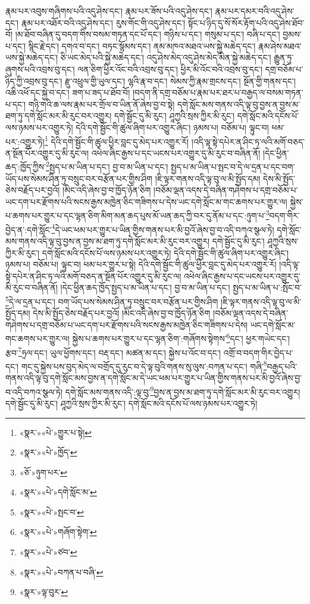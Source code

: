 རྣམ་པར་འབུས་གཞིགས་པའི་འདུ་ཤེས་དང་། རྣམ་པར་ཟོས་པའི་འདུ་ཤེས་དང་། རྣམ་པར་དམར་བའི་འདུ་ཤེས་དང་། རྣམ་པར་འཐོར་བའི་འདུ་ཤེས་དང་། རུས་གོང་གི་འདུ་ཤེས་དང་། སྟོང་པ་ཉིད་དུ་སོ་སོར་རྟོག་པའི་འདུ་ཤེས་ཐོབ་བོ། །མ་ཐོབ་བཞིན་དུ་བདག་གིས་བསམ་གཏན་དང་པོ་དང་། གཉིས་པ་དང་། གསུམ་པ་དང་། བཞི་པ་དང་། བྱམས་པ་དང་། སྙིང་རྗེ་དང་། དགའ་བ་དང་། བཏང་སྙོམས་དང་། ནམ་མཁའ་མཐའ་ཡས་སྐྱེ་མཆེད་དང་། རྣམ་ཤེས་མཐའ་ཡས་སྐྱེ་མཆེད་དང་། ཅི་ཡང་མེད་པའི་སྐྱེ་མཆེད་དང་། འདུ་ཤེས་མེད་འདུ་ཤེས་མེད་མིན་སྐྱེ་མཆེད་དང་། རྒྱུན་ཏུ་ཞུགས་པའི་འབྲས་བུ་དང་། ལན་ཅིག་ཕྱིར་འོང་བའི་འབྲས་བུ་དང་། ཕྱིར་མི་འོང་བའི་འབྲས་བུ་དང་། དགྲ་བཅོམ་པ་ཉིད་ཀྱི་འབྲས་བུ་དང་། རྫུ་འཕྲུལ་གྱི་ཡུལ་དང་། ལྷའི་རྣ་བ་དང་། སེམས་ཀྱི་རྣམ་གྲངས་དང་། སྔོན་གྱི་གནས་དང་། འཆི་འཕོ་དང་སྐྱེ་བ་དང་། ཟག་པ་ཟད་པ་ཐོབ་བོ། །བདག་ནི་དགྲ་བཅོམ་པ་རྣམ་པར་ཐར་པ་བརྒྱད་ལ་བསམ་གཏན་པ་དང་། གཉི་གའི་ཆ་ལས་རྣམ་པར་གྲོལ་བ་ཡིན་ནོ་ཞེས་བྱ་བ་སྟེ། དགེ་སློང་མས་གནས་འདི་ལྟ་བུ་བྱས་ན་བྱས་མ་ཐག་ཏུ་དགེ་སློང་མར་མི་རུང་བར་འགྱུར། དགེ་སྦྱོང་དུ་མི་རུང་། ཤཱཀྱའི་སྲས་ཀྱིར་མི་རུང་། དགེ་སློང་མའི་དངོས་པོ་ལས་ཉམས་པར་འགྱུར་ཏེ། དེའི་དགེ་སྦྱོང་གི་ཚུལ་ཞིག་པར་འགྱུར་ཞིང་། ཉམས་པ། བཅོམ་པ། ལྟུང་བ། ཕམ་པར་:འགྱུར་ཏེ།\footnote{«སྣར་»«པེ་»གྱུར་པ་སྟེ།} དེའི་དགེ་སྦྱོང་གི་ཚུལ་ཕྱིར་བླང་དུ་མེད་པར་འགྱུར་རོ། །འདི་ལྟ་སྟེ་དཔེར་ན་ཤིང་ཏ་ལའི་མགོ་བཅད་ན་སྔོན་པོར་འགྱུར་དུ་མི་རུང་ལ། འཕེལ་ཞིང་རྒྱས་པ་དང་ཡངས་པར་འགྱུར་དུ་མི་རུང་བ་བཞིན་ནོ། །དེང་ཕྱིན་ཆད་:ཁྱོད་ཀྱིས་\footnote{«སྣར་»«པེ་»ཁྱོད་}སྤྱད་པ་མ་ཡིན་པ་དང་། བྱ་བ་མ་ཡིན་པ་དང་། སྤྱད་པ་མ་ཡིན་པ་སྤང་བ་དེ་ལ་དྲན་པ་དང་བག་ཡོད་པས་སེམས་ཤིན་ཏུ་བསྲུང་བར་བརྩོན་པར་གྱིས་ཤིག །ཇི་ལྟར་གནས་འདི་ལྟ་བུ་ལ་མི་སྤྱོད་དམ། དེས་མི་སྤྱོད་ཅེས་བརྗོད་པར་བྱའོ། །མིང་འདི་ཞེས་བྱ་བ་ཁྱོད་ཉོན་ཅིག །བཅོམ་ལྡན་འདས་དེ་བཞིན་གཤེགས་པ་དགྲ་བཅོམ་པ་ཡང་དག་པར་རྫོགས་པའི་སངས་རྒྱས་མཁྱེན་ཅིང་གཟིགས་པ་དེས་ཡང་དགེ་སློང་མ་གང་ཆགས་པར་གྱུར་ལ། སྐྱེས་པ་ཆགས་པར་གྱུར་པ་དང་ལྷན་ཅིག་མིག་མན་ཆད་པུས་མོ་ཡན་ཆད་ཀྱི་བར་དུ་ནོམ་པ་དང་:ཉུག་པ་\footnote{«ཅོ་»ཉུག་པར་}བདག་གིར་བྱེད་ན་:དགེ་སློང་\footnote{«སྣར་»«པེ་»དགེ་སློང་མ་}དེ་ཡང་ཕམ་པར་གྱུར་པ་ཡིན་གྱིས་གནས་པར་མི་བྱའོ་ཞེས་བྱ་བ་འདི་བཀའ་སྩལ་ཏེ། དགེ་སློང་མས་གནས་འདི་ལྟ་བུ་བྱས་ན་བྱས་མ་ཐག་ཏུ་དགེ་སློང་མར་མི་རུང་བར་འགྱུར། དགེ་སྦྱོང་དུ་མི་རུང་། ཤཱཀྱའི་སྲས་ཀྱིར་མི་རུང་། དགེ་སློང་མའི་དངོས་པོ་ལས་ཉམས་པར་འགྱུར་ཏེ། དེའི་དགེ་སྦྱོང་གི་ཚུལ་ཞིག་པར་འགྱུར་ཞིང་། ཉམས་པ། བཅོམ་པ། ལྟུང་བ། ཕམ་པར་གྱུར་པ་སྟེ། དེའི་དགེ་སྦྱོང་གི་ཚུལ་ཕྱིར་བླང་དུ་མེད་པར་འགྱུར་རོ། །འདི་ལྟ་སྟེ་དཔེར་ན་ཤིང་ཏ་ལའི་མགོ་བཅད་ན་སྔོན་པོར་འགྱུར་དུ་མི་རུང་ལ། འཕེལ་ཞིང་རྒྱས་པ་དང་ཡངས་པར་འགྱུར་དུ་མི་རུང་བ་བཞིན་ནོ། །དེང་ཕྱིན་ཆད་ཁྱོད་སྤྱད་པ་མ་ཡིན་པ་དང་། བྱ་བ་མ་ཡིན་པ་དང་། སྤྱད་པ་མ་ཡིན་པ་:སྤོང་བ་\footnote{«སྣར་»«པེ་»སྤང་བ་}དེ་ལ་དྲན་པ་དང་། བག་ཡོད་པས་སེམས་ཤིན་ཏུ་བསྲུང་བར་བརྩོན་པར་གྱིས་ཤིག །ཇི་ལྟར་གནས་འདི་ལྟ་བུ་ལ་མི་སྤྱོད་དམ། དེས་མི་སྤྱོད་ཅེས་བརྗོད་པར་བྱའོ། །མིང་འདི་ཞེས་བྱ་བ་ཁྱོད་ཉོན་ཅིག །བཅོམ་ལྡན་འདས་དེ་བཞིན་གཤེགས་པ་དགྲ་བཅོམ་པ་ཡང་དག་པར་རྫོགས་པའི་སངས་རྒྱས་མཁྱེན་ཅིང་གཟིགས་པ་དེས། ཡང་དགེ་སློང་མ་གང་ཆགས་པར་གྱུར་ལ། སྐྱེས་པ་ཆགས་པར་གྱུར་པ་དང་ལྷན་ཅིག་:གཞོགས་སྟེགས་\footnote{«སྣར་»«པེ་»གཞོག་སྟེག་}དང་། ཕྱར་གཡེང་དང་། རྩབ་\footnote{«སྣར་»«པེ་»ཙབ་}ཧྲལ་དང་། ཡུལ་ཕྱོགས་དང་། བརྡ་དང་། མཚན་མ་དང་། སྐྱེས་པ་འོང་བ་དང་། འགྲོ་བ་བདག་གིར་བྱེད་པ་དང་། གང་དུ་སྐྱེས་པས་བུད་མེད་ལ་བགྲོད་དུ་རུང་བ་དེ་ལྟ་བུའི་གནས་སུ་ལུས་:བཀན་པ་དང་། གཞི་\footnote{«སྣར་»«པེ་»བཀན་པ་བཞི་}བརྒྱད་པའི་གནས་འདི་ལྟ་བུ་དགེ་སློང་མས་བྱས་ན་དགེ་སློང་མ་དེ་ཡང་ཕམ་པར་གྱུར་པ་ཡིན་གྱིས་གནས་པར་མི་བྱའོ་ཞེས་བྱ་བ་འདི་བཀའ་སྩལ་ཏེ། དགེ་སློང་མས་གནས་འདི་:ལྟ་བུ་\footnote{«སྣར་»ལྟ་བུར་}བྱས་ན་བྱས་མ་ཐག་ཏུ་དགེ་སློང་མར་མི་རུང་བར་འགྱུར། དགེ་སྦྱོང་དུ་མི་རུང་། ཤཱཀྱའི་སྲས་ཀྱིར་མི་རུང་། དགེ་སློང་མའི་དངོས་པོ་ལས་ཉམས་པར་འགྱུར་ཏེ། 